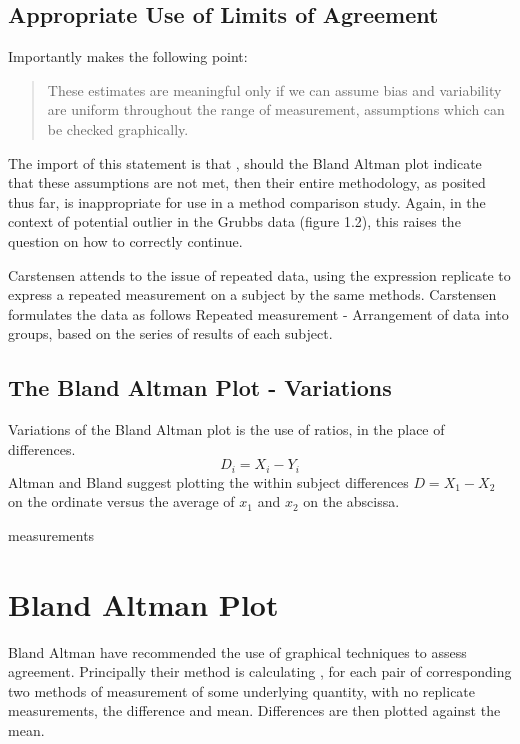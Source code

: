 \documentclass[12pt, a4paper]{report}
\theoremstyle{plain}
\theoremstyle{definition}
\theoremstyle{remark}
\begin{document}
	\subsection{Appropriate Use of Limits of Agreement}
	Importantly \citet{BA99} makes the following point:
	\begin{quote}These estimates are meaningful only if we can assume
		bias and variability are uniform throughout the range of
		measurement, assumptions which can be checked graphically.
	\end{quote}
	
	The import of this statement is that , should the Bland Altman
	plot indicate that these assumptions are not met, then their
	entire methodology, as posited thus far, is inappropriate for use
	in a method comparison study. Again, in the context of potential
	outlier in the Grubbs data (figure 1.2), this raises the question
	on how to correctly continue.
	
	Carstensen attends to the issue of repeated data, using the
	expression replicate to express a repeated measurement on a
	subject by the same methods. Carstensen formulates the data as
	follows Repeated measurement - Arrangement of data into groups,
	based on the series of results of each subject.
	
	\subsection{The Bland Altman Plot - Variations}
	Variations of the Bland Altman plot is the use of ratios, in the
	place of differences.
	\begin{equation}
	D_{i} = X_{i} - Y_{i}   \label{BA01}
	\end{equation}
	Altman and Bland suggest plotting the within subject differences $
	D = X_{1} - X_{2} $ on the ordinate versus the average of $x_{1}$
	and  $x_{2}$ on the abscissa.

	measurements\section{Bland Altman Plot} Bland Altman have
	recommended the use of graphical techniques to assess agreement.
	Principally their method is calculating , for each pair of
	corresponding two methods of measurement of some underlying
	quantity, with no replicate measurements, the difference and mean.
	Differences are then plotted against the mean.
	
\end{document}
